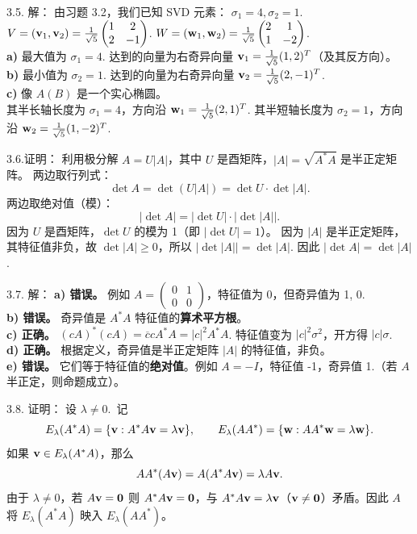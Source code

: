 \begin{exer}
3.5. 解：
由习题 3.2，我们已知 SVD 元素：
$\sigma_1 = 4, \sigma_2 = 1$.
$V = (\mathbf{v}_1, \mathbf{v}_2) = \frac{1}{\sqrt{5}} \begin{pmatrix} 1 & 2 \\ 2 & -1 \end{pmatrix}$.
$W = (\mathbf{w}_1, \mathbf{w}_2) = \frac{1}{\sqrt{5}} \begin{pmatrix} 2 & 1 \\ 1 & -2 \end{pmatrix}$.
\\
\textbf{a)} 最大值为 $\sigma_1 = 4$. 达到的向量为右奇异向量 $\mathbf{v}_1 = \frac{1}{\sqrt{5}}(1, 2)^T$（及其反方向）。\\
\textbf{b)} 最小值为 $\sigma_2 = 1$. 达到的向量为右奇异向量 $\mathbf{v}_2 = \frac{1}{\sqrt{5}}(2, -1)^T$.\\
\textbf{c)} 像 $A(B)$ 是一个实心椭圆。\\
其半长轴长度为 $\sigma_1 = 4$，方向沿 $\mathbf{w}_1 = \frac{1}{\sqrt{5}}(2, 1)^T$.
其半短轴长度为 $\sigma_2 = 1$，方向沿 $\mathbf{w}_2 = \frac{1}{\sqrt{5}}(1, -2)^T$.

3.6.证明：
利用极分解 $A = U|A|$，其中 $U$ 是酉矩阵，$|A| = \sqrt{A^*A}$ 是半正定矩阵。
两边取行列式：
$$ \det A = \det(U |A|) = \det U \cdot \det |A|. $$
两边取绝对值（模）：
$$ |\det A| = |\det U| \cdot |\det |A||. $$
因为 $U$ 是酉矩阵，$\det U$ 的模为 1（即 $|\det U| = 1$）。
因为 $|A|$ 是半正定矩阵，其特征值非负，故 $\det |A| \ge 0$，所以 $|\det |A|| = \det |A|$.
因此 $|\det A| = \det |A|$.

3.7. 解：
\textbf{a) 错误。} 例如 $A = \begin{pmatrix} 0 & 1 \\ 0 & 0 \end{pmatrix}$，特征值为 0，但奇异值为 1, 0.\\
\textbf{b) 错误。} 奇异值是 $A^*A$ 特征值的\textbf{算术平方根}。\\
\textbf{c) 正确。} $(cA)^*(cA) = \overline{c}c A^*A = |c|^2 A^*A$. 特征值变为 $|c|^2 \sigma^2$，开方得 $|c|\sigma$.\\
\textbf{d) 正确。} 根据定义，奇异值是半正定矩阵 $|A|$ 的特征值，非负。\\
\textbf{e) 错误。} 它们等于特征值的\textbf{绝对值}。例如 $A = -I$，特征值 -1，奇异值 1.（若 $A$ 半正定，则命题成立）。

3.8. 证明：
设 $\lambda\neq0$.~记
$$E_\lambda(A^*A)=\{\mathbf{v}:A^*A\mathbf{v}=\lambda\mathbf{v}\},\qquad
E_\lambda(AA^*)=\{\mathbf{w}:AA^*\mathbf{w}=\lambda\mathbf{w}\}.$$
如果 $\mathbf{v}\in E_\lambda(A^*A)$，那么
$$AA^*(A\mathbf{v})=A(A^*A\mathbf{v})=\lambda A\mathbf{v}.$$
由于 $\lambda\neq0$，若 $A\mathbf{v}=\mathbf{0}$ 则 $A^*A\mathbf{v}=\mathbf{0}$，与 $A^*A\mathbf{v}=\lambda\mathbf{v}$（$\mathbf{v}\neq\mathbf{0}$）矛盾。因此 $A$ 将 $E_\lambda(A^*A)$ 映入 $E_\lambda(AA^*)$。


\end{exer}
